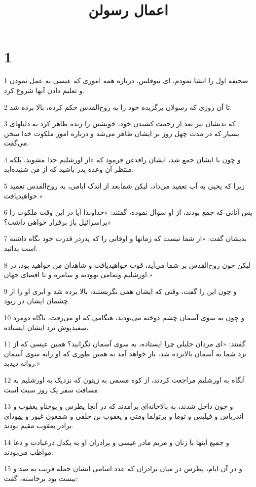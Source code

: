 

\title{اعمال رسولن}


\chapter{1}

\par 1 صحیفه اول را انشا نمودم، ای تیوفلس، درباره همه اموری که عیسی به عمل نمودن و تعلیم دادن آنها شروع کرد.
\par 2 تا آن روزی که رسولان برگزیده خود را به روح‌القدس حکم کرده، بالا برده شد.
\par 3 که بدیشان نیز بعد از زحمت کشیدن خود، خویشتن را زنده ظاهر کرد به دلیلهای بسیار که در مدت چهل روز بر ایشان ظاهر می‌شد و درباره امور ملکوت خدا سخن می‌گفت.
\par 4 و چون با ایشان جمع شد، ایشان راقدغن فرمود که «از اورشلیم جدا مشوید، بلکه منتظر آن وعده پدر باشید که از من شنیده‌اید.
\par 5 زیرا که یحیی به آب تعمید می‌داد، لیکن شمابعد از اندک ایامی، به روح‌القدس تعمید خواهیدیافت.»
\par 6 پس آنانی که جمع بودند، از او سوال نموده، گفتند: «خداوندا آیا در این وقت ملکوت را براسرائیل باز برقرار خواهی داشت؟»
\par 7 بدیشان گفت: «از شما نیست که زمانها و اوقاتی را که پدردر قدرت خود نگاه داشته است بدانید.
\par 8 لیکن چون روح‌القدس بر شما می‌آید، قوت خواهیدیافت و شاهدان من خواهید بود، در اورشلیم وتمامی یهودیه و سامره و تا اقصای جهان.»
\par 9 و چون این را گفت، وقتی که ایشان همی نگریستند، بالا برده شد و ابری او را از چشمان ایشان در ربود.
\par 10 و چون به سوی آسمان چشم دوخته می‌بودند، هنگامی که او می‌رفت، ناگاه دومرد سفیدپوش نزد ایشان ایستاده،
\par 11 گفتند: «ای مردان جلیلی چرا ایستاده، به سوی آسمان نگرانید؟ همین عیسی که از نزد شما به آسمان بالابرده شد، باز خواهد آمد به همین طوری که او رابه سوی آسمان روانه دیدید.»
\par 12 آنگاه به اورشلیم مراجعت کردند، از کوه مسمی به زیتون که نزدیک به اورشلیم به مسافت سفر یک روز سبت است.
\par 13 و چون داخل شدند، به بالاخانه‌ای برآمدند که در آنجا پطرس و یوحناو یعقوب و اندریاس و فیلپس و توما و برتولما ومتی و یعقوب بن حلفی و شمعون غیور و یهودای برادر بعقوب مقیم بودند.
\par 14 و جمیع اینها با زنان و مریم مادر عیسی و برادران او به یکدل درعبادت و دعا مواظب می‌بودند.
\par 15 و در آن ایام، پطرس در میان برادران که عدد اسامی ایشان جمله قریب به صد و بیست بود برخاسته، گفت:
